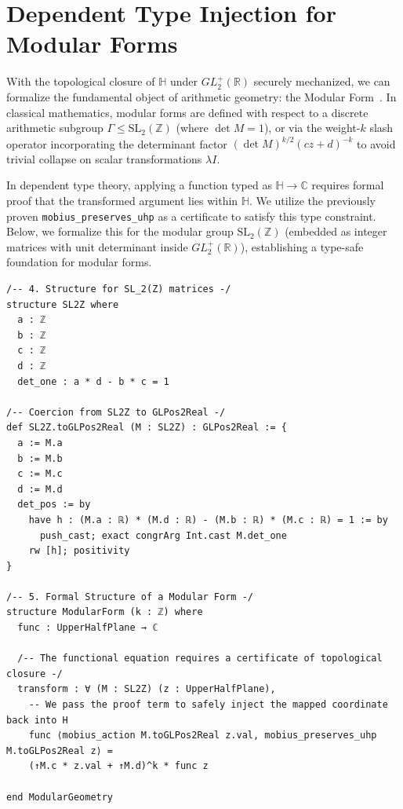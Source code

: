 \documentclass[11pt, a4paper]{article}
\theoremstyle{remark}
\begin{document}
\section{Dependent Type Injection for Modular Forms}

With the topological closure of $\mathbb{H}$ under $GL_2^+(\mathbb{R})$ securely mechanized, we can formalize the fundamental object of arithmetic geometry: the Modular Form~\cite{Miyake2006}. In classical mathematics, modular forms are defined with respect to a discrete arithmetic subgroup $\Gamma \le \mathrm{SL}_2(\mathbb{Z})$ (where $\det M = 1$), or via the weight-$k$ slash operator incorporating the determinant factor $(\det M)^{k/2} (cz+d)^{-k}$ to avoid trivial collapse on scalar transformations $\lambda I$. 

In dependent type theory, applying a function typed as $\mathbb{H} \to \mathbb{C}$ requires formal proof that the transformed argument lies within $\mathbb{H}$. We utilize the previously proven \texttt{mobius\_preserves\_uhp} as a certificate to satisfy this type constraint. Below, we formalize this for the modular group $\mathrm{SL}_2(\mathbb{Z})$ (embedded as integer matrices with unit determinant inside $GL_2^+(\mathbb{R})$), establishing a type-safe foundation for modular forms.

\begin{lstlisting}[language=lean4, caption={Definition of a Modular Form for $\mathrm{SL}_2(\mathbb{Z})$ in Lean 4}]
/-- 4. Structure for SL_2(Z) matrices -/
structure SL2Z where
  a : ℤ
  b : ℤ
  c : ℤ
  d : ℤ
  det_one : a * d - b * c = 1

/-- Coercion from SL2Z to GLPos2Real -/
def SL2Z.toGLPos2Real (M : SL2Z) : GLPos2Real := {
  a := M.a
  b := M.b
  c := M.c
  d := M.d
  det_pos := by
    have h : (M.a : ℝ) * (M.d : ℝ) - (M.b : ℝ) * (M.c : ℝ) = 1 := by
      push_cast; exact congrArg Int.cast M.det_one
    rw [h]; positivity
}

/-- 5. Formal Structure of a Modular Form -/
structure ModularForm (k : ℤ) where
  func : UpperHalfPlane → ℂ
  
  /-- The functional equation requires a certificate of topological closure -/
  transform : ∀ (M : SL2Z) (z : UpperHalfPlane),
    -- We pass the proof term to safely inject the mapped coordinate back into H
    func ⟨mobius_action M.toGLPos2Real z.val, mobius_preserves_uhp M.toGLPos2Real z⟩ = 
    (↑M.c * z.val + ↑M.d)^k * func z

end ModularGeometry
\end{lstlisting}
\end{document}
